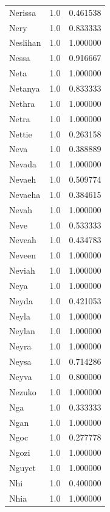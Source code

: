\documentclass[
  letterpaper,
  DIV=11,
  numbers=noendperiod]{scrreprt}
\begin{document}
\begin{tabular}{lrr}
Nerissa         &   1.0 &   0.461538 \\
Nery            &   1.0 &   0.833333 \\
Neslihan        &   1.0 &   1.000000 \\
Nessa           &   1.0 &   0.916667 \\
Neta            &   1.0 &   1.000000 \\
Netanya         &   1.0 &   0.833333 \\
Nethra          &   1.0 &   1.000000 \\
Netra           &   1.0 &   1.000000 \\
Nettie          &   1.0 &   0.263158 \\
Neva            &   1.0 &   0.388889 \\
Nevada          &   1.0 &   1.000000 \\
Nevaeh          &   1.0 &   0.509774 \\
Nevaeha         &   1.0 &   0.384615 \\
Nevah           &   1.0 &   1.000000 \\
Neve            &   1.0 &   0.533333 \\
Neveah          &   1.0 &   0.434783 \\
Neveen          &   1.0 &   1.000000 \\
Neviah          &   1.0 &   1.000000 \\
Neya            &   1.0 &   1.000000 \\
Neyda           &   1.0 &   0.421053 \\
Neyla           &   1.0 &   1.000000 \\
Neylan          &   1.0 &   1.000000 \\
Neyra           &   1.0 &   1.000000 \\
Neysa           &   1.0 &   0.714286 \\
Neyva           &   1.0 &   0.800000 \\
Nezuko          &   1.0 &   1.000000 \\
Nga             &   1.0 &   0.333333 \\
Ngan            &   1.0 &   1.000000 \\
Ngoc            &   1.0 &   0.277778 \\
Ngozi           &   1.0 &   1.000000 \\
Nguyet          &   1.0 &   1.000000 \\
Nhi             &   1.0 &   0.400000 \\
Nhia            &   1.0 &   1.000000 \\

\end{tabular}
\end{document}
